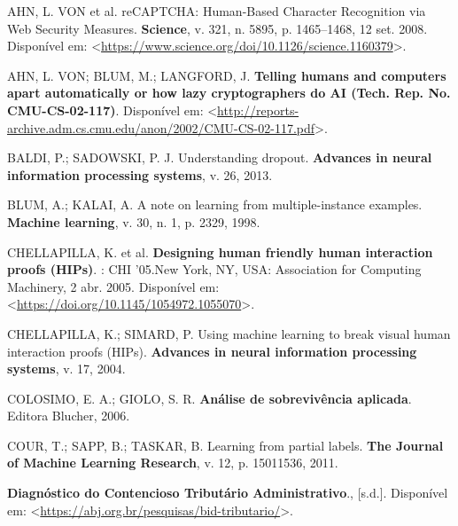 \documentclass[12pt,twoside,brazilian]{book}
\newlength{\cslhangindent}
\newlength{\cslentryspacingunit} %
\newenvironment{CSLReferences}[2] %
 {%
  \setlength{\parindent}{0pt}
  \ifodd #1
  \let\oldpar\par
  \def\par{\hangindent=\cslhangindent\oldpar}
  \fi
  \setlength{\parskip}{#2\cslentryspacingunit}
 }%
 {}
\begin{document}

\hypertarget{refs}{}
\begin{CSLReferences}{0}{1}
\leavevmode{}%
AHN, L. VON et al. reCAPTCHA: Human-Based Character Recognition via Web
Security Measures. \textbf{Science}, v. 321, n. 5895, p. 1465--1468, 12
set. 2008. Disponível em:
\textless{}\url{https://www.science.org/doi/10.1126/science.1160379}\textgreater.

\leavevmode{}%
AHN, L. VON; BLUM, M.; LANGFORD, J. \textbf{Telling humans and computers
apart automatically or how lazy cryptographers do AI (Tech. Rep. No.
CMU-CS-02-117)}. Disponível em:
\textless{}\url{http://reports-archive.adm.cs.cmu.edu/anon/2002/CMU-CS-02-117.pdf}\textgreater.

\leavevmode{}%
BALDI, P.; SADOWSKI, P. J. Understanding dropout. \textbf{Advances in
neural information processing systems}, v. 26, 2013.

\leavevmode{}%
BLUM, A.; KALAI, A. A note on learning from multiple-instance examples.
\textbf{Machine learning}, v. 30, n. 1, p. 2329, 1998.

\leavevmode{}%
CHELLAPILLA, K. et al. \textbf{Designing human friendly human
interaction proofs (HIPs)}. : CHI '05.New York, NY, USA: Association for
Computing Machinery, 2 abr. 2005. Disponível em:
\textless{}\url{https://doi.org/10.1145/1054972.1055070}\textgreater.

\leavevmode{}%
CHELLAPILLA, K.; SIMARD, P. Using machine learning to break visual human
interaction proofs (HIPs). \textbf{Advances in neural information
processing systems}, v. 17, 2004.

\leavevmode{}%
COLOSIMO, E. A.; GIOLO, S. R. \textbf{Análise de sobrevivência
aplicada}. Editora Blucher, 2006.

\leavevmode{}%
COUR, T.; SAPP, B.; TASKAR, B. Learning from partial labels. \textbf{The
Journal of Machine Learning Research}, v. 12, p. 15011536, 2011.

\leavevmode{}%
\textbf{Diagnóstico do Contencioso Tributário Administrativo}.,
{[}s.d.{]}. Disponível em:
\textless{}\url{https://abj.org.br/pesquisas/bid-tributario/}\textgreater.


\end{CSLReferences}
\end{document}
